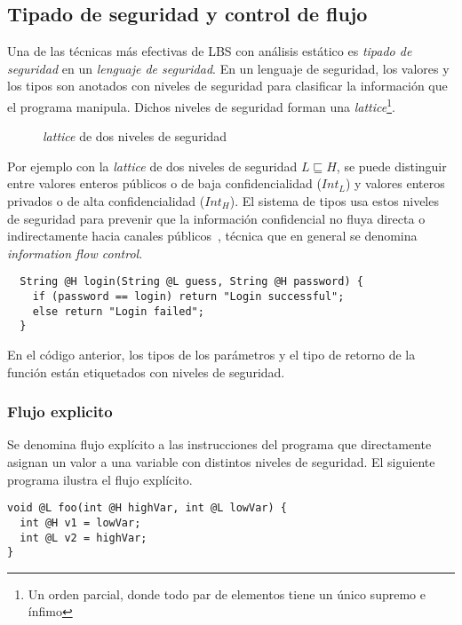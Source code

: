 \subsection{Tipado de seguridad y control de flujo}
Una de las técnicas más efectivas de LBS con análisis estático es \textit{tipado de seguridad} en un \textit{lenguaje de seguridad}. En un lenguaje de seguridad, los valores y los tipos son anotados con niveles de seguridad para clasificar la información que el programa manipula. Dichos niveles de seguridad forman una \textit{lattice}\footnote{Un orden parcial, donde todo par de elementos tiene un único supremo e ínfimo}.

	\begin{figure}[ht]
		\centering
		\caption{\textit{lattice} de dos niveles de seguridad}
	\end{figure}


  	Por ejemplo con la \textit{lattice} de dos niveles de seguridad $L \sqsubseteq H$, se puede distinguir entre valores enteros públicos o de baja confidencialidad ($Int_L$) y valores enteros privados o de alta confidencialidad ($Int_H$). El sistema de tipos usa estos niveles de seguridad para prevenir que la información confidencial no fluya directa o indirectamente hacia canales públicos~\cite{volpanoAl:S96}, técnica que en general se denomina \textit{information flow control}.

  	\begin{lstlisting}
  String @H login(String @L guess, String @H password) {
  	if (password == login) return "Login successful";
  	else return "Login failed";
  }
  	\end{lstlisting}

    En el código anterior, los tipos de los parámetros y el tipo de retorno de la función están etiquetados con niveles de seguridad.

\subsubsection{Flujo explicito}
Se denomina flujo explícito a las instrucciones del programa que directamente asignan un valor a una variable con distintos niveles de seguridad. El siguiente programa ilustra el flujo explícito.

\begin{lstlisting}
void @L foo(int @H highVar, int @L lowVar) {
  int @H v1 = lowVar;
  int @L v2 = highVar;
}
\end{lstlisting}


